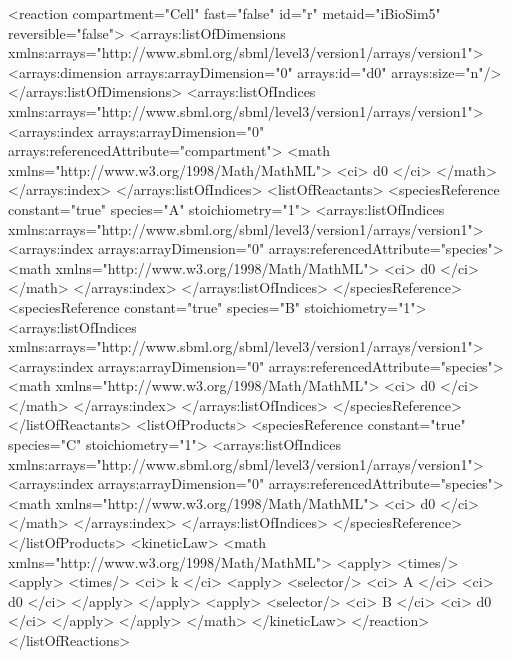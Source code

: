 \begin{example}
      <reaction compartment="Cell" fast="false" id="r" metaid="iBioSim5" reversible="false">
        <arrays:listOfDimensions xmlns:arrays="http://www.sbml.org/sbml/level3/version1/arrays/version1">
          <arrays:dimension arrays:arrayDimension="0" arrays:id="d0" arrays:size="n"/>
        </arrays:listOfDimensions>
        <arrays:listOfIndices xmlns:arrays="http://www.sbml.org/sbml/level3/version1/arrays/version1">
          <arrays:index arrays:arrayDimension="0" arrays:referencedAttribute="compartment">
            <math xmlns="http://www.w3.org/1998/Math/MathML">            
              <ci> d0 </ci>
            </math>
                    </arrays:index>
        </arrays:listOfIndices>
        <listOfReactants>
          <speciesReference constant="true" species="A" stoichiometry="1">
            <arrays:listOfIndices xmlns:arrays="http://www.sbml.org/sbml/level3/version1/arrays/version1">
              <arrays:index arrays:arrayDimension="0" arrays:referencedAttribute="species">
                <math xmlns="http://www.w3.org/1998/Math/MathML">                
                  <ci> d0 </ci>
                </math>
                            </arrays:index>
            </arrays:listOfIndices>
          </speciesReference>
          <speciesReference constant="true" species="B" stoichiometry="1">
            <arrays:listOfIndices xmlns:arrays="http://www.sbml.org/sbml/level3/version1/arrays/version1">
              <arrays:index arrays:arrayDimension="0" arrays:referencedAttribute="species">
                <math xmlns="http://www.w3.org/1998/Math/MathML">                
                  <ci> d0 </ci>
                </math>
                            </arrays:index>
            </arrays:listOfIndices>
          </speciesReference>
        </listOfReactants>
        <listOfProducts>
          <speciesReference constant="true" species="C" stoichiometry="1">
            <arrays:listOfIndices xmlns:arrays="http://www.sbml.org/sbml/level3/version1/arrays/version1">
              <arrays:index arrays:arrayDimension="0" arrays:referencedAttribute="species">
                <math xmlns="http://www.w3.org/1998/Math/MathML">                
                  <ci> d0 </ci>
                </math>
                            </arrays:index>
            </arrays:listOfIndices>
          </speciesReference>
        </listOfProducts>
        <kineticLaw>
          <math xmlns="http://www.w3.org/1998/Math/MathML">          
            <apply>
              <times/>
              <apply>
                <times/>
                <ci> k </ci>
                <apply>
                  <selector/>
                  <ci> A </ci>
                  <ci> d0 </ci>
                </apply>
              </apply>
              <apply>
                <selector/>
                <ci> B </ci>
                <ci> d0 </ci>
              </apply>
            </apply>
          </math>
                </kineticLaw>
      </reaction>
    </listOfReactions>
\end{example}


